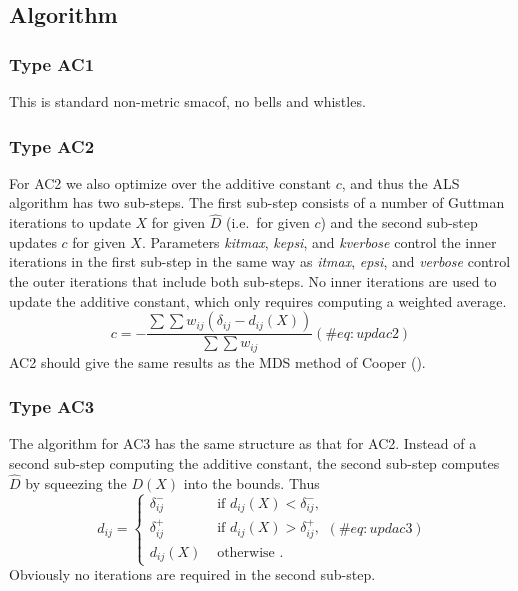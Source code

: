 \documentclass[
  12pt,
  letterpaper,
  DIV=11,
  numbers=noendperiod]{scrartcl}
\begin{document}
\subsection{Algorithm}\label{algorithm}

\subsubsection{Type AC1}\label{type-ac1}

This is standard non-metric smacof, no bells and whistles.

\subsubsection{Type AC2}\label{type-ac2}

For AC2 we also optimize over the additive constant \(c\), and thus the
ALS algorithm has two sub-steps. The first sub-step consists of a number
of Guttman iterations to update \(X\) for given \(\hat D\) (i.e.~for
given \(c\)) and the second sub-step updates \(c\) for given \(X\).
Parameters \emph{kitmax}, \emph{kepsi}, and \emph{kverbose} control the
inner iterations in the first sub-step in the same way as \emph{itmax},
\emph{epsi}, and \emph{verbose} control the outer iterations that
include both sub-steps. No inner iterations are used to update the
additive constant, which only requires computing a weighted average.
\begin{equation}
c=-\frac{\sum\sum w_{ij}(\delta_{ij}-d_{ij}(X))}{\sum\sum w_{ij}}
(\#eq:updac2)
\end{equation} AC2 should give the same results as the MDS method of
Cooper ().

\subsubsection{Type AC3}\label{type-ac3}

The algorithm for AC3 has the same structure as that for AC2. Instead of
a second sub-step computing the additive constant, the second sub-step
computes \(\hat D\) by squeezing the \(D(X)\) into the bounds. Thus
\begin{equation}
\hat d_{ij}=\begin{cases}
\delta_{ij}^-&\text{ if }d_{ij}(X)<\delta_{ij}^-,\\
\delta_{ij}^+&\text{ if }d_{ij}(X)>\delta_{ij}^+,\\
d_{ij}(X)&\text{ otherwise }.
\end{cases}
(\#eq:updac3)
\end{equation} Obviously no iterations are required in the second
sub-step.
\end{document}
